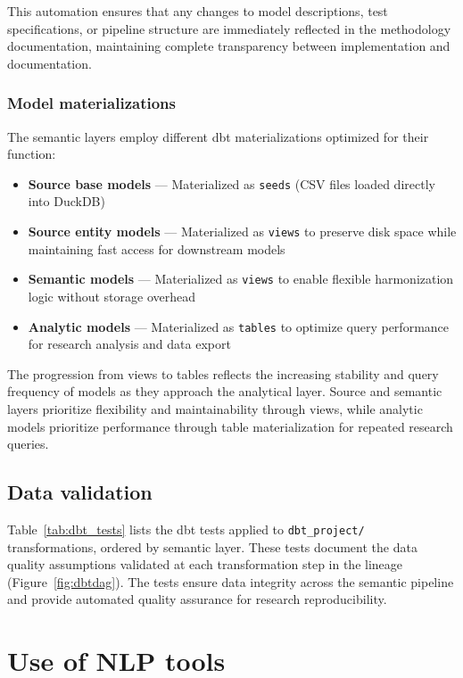 \documentclass{article}
\begin{document}
This automation ensures that any changes to model descriptions, test specifications, or pipeline structure are immediately reflected in the methodology documentation, maintaining complete transparency between implementation and documentation.

\subsubsection{Model materializations}

The semantic layers employ different dbt materializations optimized for their function:

\begin{itemize}
    \item \textbf{Source base models} — Materialized as \texttt{seeds} (CSV files loaded directly into DuckDB)
    \item \textbf{Source entity models} — Materialized as \texttt{views} to preserve disk space while maintaining fast access for downstream models
    \item \textbf{Semantic models} — Materialized as \texttt{views} to enable flexible harmonization logic without storage overhead
    \item \textbf{Analytic models} — Materialized as \texttt{tables} to optimize query performance for research analysis and data export
\end{itemize}

The progression from views to tables reflects the increasing stability and query frequency of models as they approach the analytical layer. Source and semantic layers prioritize flexibility and maintainability through views, while analytic models prioritize performance through table materialization for repeated research queries.

\subsection{Data validation}

Table~\ref{tab:dbt_tests} lists the dbt tests applied to \texttt{dbt\_project/} transformations, ordered by semantic layer. These tests document the data quality assumptions validated at each transformation step in the lineage (Figure~\ref{fig:dbtdag}). The tests ensure data integrity across the semantic pipeline and provide automated quality assurance for research reproducibility.



\section{Use of NLP tools}
\end{document}
